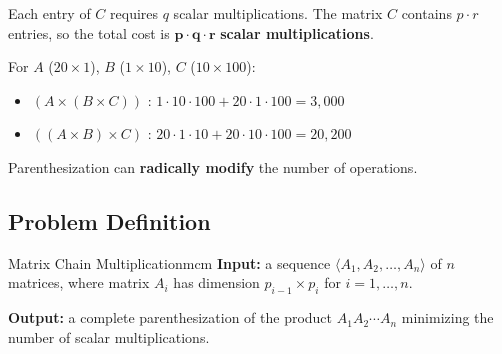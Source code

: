 \begin{center}
\end{center}

Each entry of $C$ requires $q$ scalar multiplications.
The matrix $C$ contains $p \cdot r$ entries, so the total cost is
$\mathbf{p \cdot q \cdot r}$ \textbf{scalar multiplications}.

\begin{tcolorbox}[colback=lightyellow, colframe=orange!70!black, fonttitle=\bfseries,
                  title={Why does the association order matter?}]
For $A$ ($20 \times 1$), $B$ ($1 \times 10$), $C$ ($10 \times 100$):
\begin{itemize}[noitemsep]
  \item $(A \times (B \times C))$ : $1\cdot10\cdot100 + 20\cdot1\cdot100 = 3,000$
  \item $((A \times B) \times C)$ : $20\cdot1\cdot10 + 20\cdot10\cdot100 = 20,200$
\end{itemize}
Parenthesization can \textbf{radically modify} the number of operations.
\end{tcolorbox}

\subsection{Problem Definition}

\begin{definition}{Matrix Chain Multiplication}{mcm}
\textbf{Input:} a sequence $\langle A_1, A_2, \ldots, A_n \rangle$ of $n$ matrices,
where matrix $A_i$ has dimension $p_{i-1} \times p_i$ for $i = 1, \ldots, n$.

\textbf{Output:} a complete parenthesization of the product $A_1 A_2 \cdots A_n$
minimizing the number of scalar multiplications.
\end{definition}

